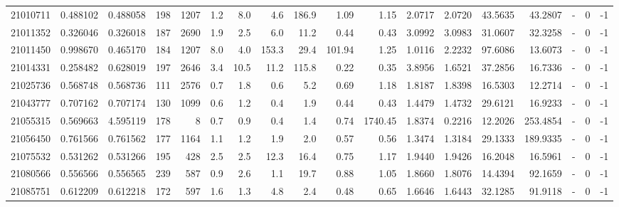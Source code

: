 \begin{tabular}{rrrrrrrrrrrrrrrlrr}
  21010711 & 0.488102 &   0.488058 &  198 & 1207 &      1.2 &      8.0 &     4.6 &    186.9 &       1.09 &        1.15 &  2.0717 &  2.0720 &   43.5635 &   43.2807 &             - &        0 &         -1 \\
  21011352 & 0.326046 &   0.326018 &  187 & 2690 &      1.9 &      2.5 &     6.0 &     11.2 &       0.44 &        0.43 &  3.0992 &  3.0983 &   31.0607 &   32.3258 &             - &        0 &         -1 \\
  21011450 & 0.998670 &   0.465170 &  184 & 1207 &      8.0 &      4.0 &   153.3 &     29.4 &     101.94 &        1.25 &  1.0116 &  2.2232 &   97.6086 &   13.6073 &             - &        0 &         -1 \\
  21014331 & 0.258482 &   0.628019 &  197 & 2646 &      3.4 &     10.5 &    11.2 &    115.8 &       0.22 &        0.35 &  3.8956 &  1.6521 &   37.2856 &   16.7336 &             - &        0 &         -1 \\
  21025736 & 0.568748 &   0.568736 &  111 & 2576 &      0.7 &      1.8 &     0.6 &      5.2 &       0.69 &        1.18 &  1.8187 &  1.8398 &   16.5303 &   12.2714 &             - &        0 &         -1 \\
  21043777 & 0.707162 &   0.707174 &  130 & 1099 &      0.6 &      1.2 &     0.4 &      1.9 &       0.44 &        0.43 &  1.4479 &  1.4732 &   29.6121 &   16.9233 &             - &        0 &         -1 \\
  21055315 & 0.569663 &   4.595119 &  178 &    8 &      0.7 &      0.9 &     0.4 &      1.4 &       0.74 &     1740.45 &  1.8374 &  0.2216 &   12.2026 &  253.4854 &             - &        0 &         -1 \\
  21056450 & 0.761566 &   0.761562 &  177 & 1164 &      1.1 &      1.2 &     1.9 &      2.0 &       0.57 &        0.56 &  1.3474 &  1.3184 &   29.1333 &  189.9335 &             - &        0 &         -1 \\
  21075532 & 0.531262 &   0.531266 &  195 &  428 &      2.5 &      2.5 &    12.3 &     16.4 &       0.75 &        1.17 &  1.9440 &  1.9426 &   16.2048 &   16.5961 &             - &        0 &         -1 \\
  21080566 & 0.556566 &   0.556565 &  239 &  587 &      0.9 &      2.6 &     1.1 &     19.7 &       0.88 &        1.05 &  1.8660 &  1.8076 &   14.4394 &   92.1659 &             - &        0 &         -1 \\
  21085751 & 0.612209 &   0.612218 &  172 &  597 &      1.6 &      1.3 &     4.8 &      2.4 &       0.48 &        0.65 &  1.6646 &  1.6443 &   32.1285 &   91.9118 &             - &        0 &         -1 \\

\end{tabular}
